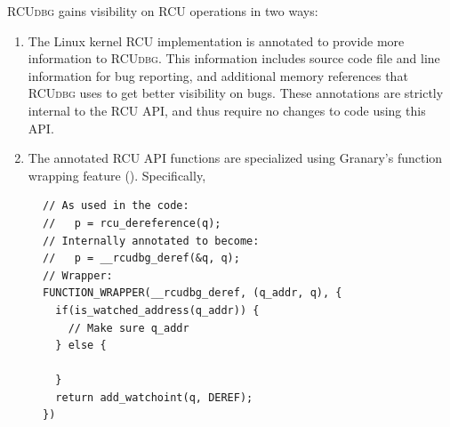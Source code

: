 \documentclass[preprint]{sigplanconf}
\newcommand{\toolname}[1]{{\scshape #1}}
\begin{document}


\toolname{RCUdbg} gains visibility on RCU operations in two ways: \begin{enumerate}
	\item The Linux kernel RCU implementation is annotated to provide more information to \toolname{RCUdbg}. This information includes source code file and line information for bug reporting, and additional memory references that \toolname{RCUdbg} uses to get better visibility on bugs. These annotations are strictly internal to the RCU API, and thus require no changes to code using this API.
	\item The annotated RCU API functions are specialized using Granary's function wrapping feature (). Specifically, 
\end{enumerate}





\begin{figure}[t!]
\lstset{language=C, tabsize=2, stepnumber=1}
\begin{lstlisting}[basicstyle=\footnotesize\ttfamily]
// As used in the code:
//   p = rcu_dereference(q);
// Internally annotated to become:
//   p = __rcudbg_deref(&q, q);
// Wrapper:
FUNCTION_WRAPPER(__rcudbg_deref, (q_addr, q), {
  if(is_watched_address(q_addr)) {
    // Make sure q_addr
  } else {

  }
  return add_watchoint(q, DEREF);
})
\end{lstlisting}
\caption{}
\label{fig:rcu_dereference_wrapper}
\end{figure}
\end{document}
